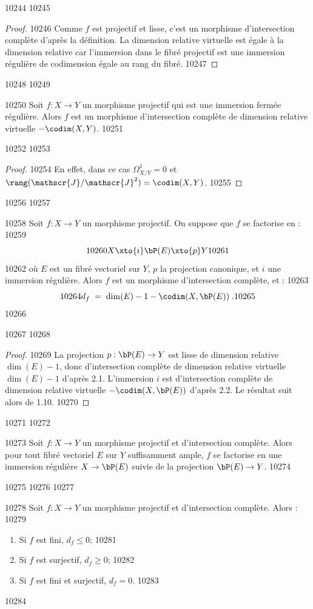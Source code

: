 10244	
 10245	\begin{proof}
 10246	Comme $f$ est projectif et lisse, c'est un morphisme d'intersection complète d'après la définition. La dimension relative virtuelle est égale à la dimension relative car l'immersion dans le fibré projectif est une immersion régulière de codimension égale au rang du fibré.
 10247	\end{proof}
 10248	
 10249	\begin{proposition}[2.2]%
 10250	Soit $f : X \to Y$ un morphisme projectif qui est une immersion fermée régulière. Alors $f$ est un morphisme d'intersection complète de dimension relative virtuelle $-\codim(X,Y)$.
 10251	\end{proposition}
 10252	
 10253	\begin{proof}
 10254	En effet, dans ce cas $\Omega^1_{X/Y} = 0$ et $\rang(\mathscr{J}/\mathscr{J}^2) = \codim(X,Y)$.
 10255	\end{proof}
 10256	
 10257	\begin{theoreme}[2.3]%
 10258	Soit $f : X \to Y$ un morphisme projectif. On suppose que $f$ se factorise en :
 10259	\[
 10260	X \xto{i} \bP(E) \xto{p} Y
 10261	\]
 10262	où $E$ est un fibré vectoriel sur $Y$, $p$ la projection canonique, et $i$ une immersion régulière. Alors $f$ est un morphisme d'intersection complète, et :
 10263	\[
 10264	d_f \; = \; \dim(E) - 1 - \codim(X, \bP(E))\; .
 10265	\]
 10266	\end{theoreme}
 10267	
 10268	\begin{proof}
 10269	La projection $p : \bP(E) \to Y$ est lisse de dimension relative $\dim(E) - 1$, donc d'intersection complète de dimension relative virtuelle $\dim(E) - 1$ d'après 2.1. L'immersion $i$ est d'intersection complète de dimension relative virtuelle $-\codim(X, \bP(E))$ d'après 2.2. Le résultat suit alors de 1.10.
 10270	\end{proof}
 10271	
 10272	\begin{corollaire}[2.4]%
 10273	Soit $f : X \to Y$ un morphisme projectif et d'intersection complète. Alors pour tout fibré vectoriel $E$ sur $Y$ suffisamment ample, $f$ se factorise en une immersion régulière $X \to \bP(E)$ suivie de la projection $\bP(E) \to Y$.
 10274	\end{corollaire}
 10275	
 10276	
 10277	\begin{proposition}[2.5]%
 10278	Soit $f : X \to Y$ un morphisme projectif et d'intersection complète. Alors :
 10279	\begin{enumerate}
 10280	\item Si $f$ est fini, $d_f \leq 0$;
 10281	\item Si $f$ est surjectif, $d_f \geq 0$;
 10282	\item Si $f$ est fini et surjectif, $d_f = 0$.
 10283	\end{enumerate}
 10284	\end{proposition}
